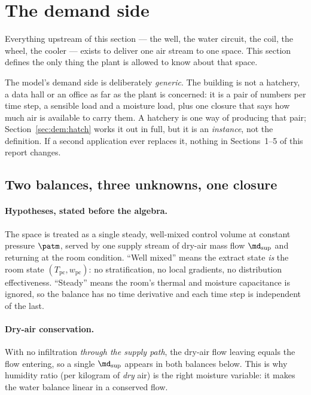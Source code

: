 \section{The demand side}\label{sec:dem:top}
\label{sec:dem:interface}

Everything upstream of this section --- the well, the water circuit, the coil, the
wheel, the cooler --- exists to deliver one air stream to one space. This section
defines the only thing the plant is allowed to know about that space.

The model's demand side is deliberately \emph{generic}. The building is not a
hatchery, a data hall or an office as far as the plant is concerned: it is a pair
of numbers per time step, a sensible load and a moisture load, plus one closure
that says how much air is available to carry them. A hatchery is one way of
producing that pair; Section~\ref{sec:dem:hatch} works it out in full, but it is
an \emph{instance}, not the definition. If a second application ever replaces it,
nothing in Sections~1--5 of this report changes.

\subsection{Two balances, three unknowns, one closure}
\label{sec:dem:balances}

\paragraph{Hypotheses, stated before the algebra.} The space is treated as a
single steady, well-mixed control volume at constant pressure $\patm$, served by one
supply stream of dry-air mass flow $\md_{\mathrm{sup}}$ and returning at the room
condition. ``Well mixed'' means the extract state \emph{is} the room state
$(T_{\mathrm{pc}},w_{\mathrm{pc}})$: no stratification, no local gradients, no
distribution effectiveness. ``Steady'' means the room's thermal and moisture
capacitance is ignored, so the balance has no time derivative and each time step
is independent of the last.

\paragraph{Dry-air conservation.} With no infiltration \emph{through the supply
path}, the dry-air flow leaving equals the flow entering, so a single
$\md_{\mathrm{sup}}$ appears in both balances below. This is why humidity ratio
(per kilogram of \emph{dry} air) is the right moisture variable: it makes the
water balance linear in a conserved flow.

